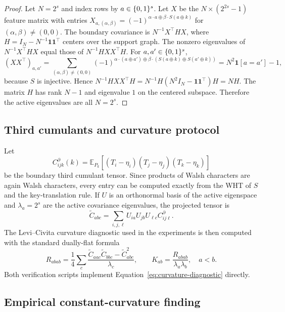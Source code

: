 \begin{proof}
Let $N=2^s$ and index rows by $a\in\{0,1\}^{s}$.  Let $X$ be the $N\times(2^{2s}-1)$
feature matrix with entries
$X_{a,(\alpha,\beta)}=(-1)^{\alpha\cdot a\oplus\beta\cdot S(a\oplus k)}$ for
$(\alpha,
\beta)\neq(0,0)$.  The boundary covariance is
$N^{-1}X^\top H X$, where $H=I_N-N^{-1}\mathbf 1\mathbf 1^\top$ centers over the
support graph.  The nonzero eigenvalues of $N^{-1}X^\top H X$ equal those of
$N^{-1}HXX^\top H$.  For $a,a'\in\{0,1\}^{s}$,
\[
 (XX^\top)_{a,a'}=
 \sum_{(\alpha,\beta)\neq(0,0)}
 (-1)^{\alpha\cdot(a\oplus a')\oplus
 \beta\cdot(S(a\oplus k)\oplus S(a'\oplus k))}
 =N^2\mathbf 1[a=a']-1,
\]
because $S$ is injective.  Hence
$N^{-1}HXX^\top H=N^{-1}H(N^2I_N-\mathbf 1\mathbf 1^\top)H=NH$.
The matrix $H$ has rank $N-1$ and eigenvalue $1$ on the centered subspace.
Therefore the active eigenvalues are all $N=2^s$.
\end{proof}

\subsection{Third cumulants and curvature protocol}\label{subsec:third-cum}

Let
\begin{equation}\label{eq:third-cumulant}
  C^{\partial}_{ijk}(k)=
  \mathbb E_{P_k}\left[(T_i-\eta_i)(T_j-\eta_j)(T_k-\eta_k)\right]
\end{equation}
be the boundary third cumulant tensor.  Since products of Walsh characters are
again Walsh characters, every entry can be computed exactly from the WHT of
$S$ and the key-translation rule.  If $U$ is an orthonormal basis of the active
eigenspace and $\lambda_a=2^s$ are the active covariance eigenvalues, the
projected tensor is
\begin{equation}\label{eq:projected-cumulant}
  \widetilde C_{abc}=\sum_{i,j,\ell}U_{ia}U_{jb}U_{\ell c}C^{\partial}_{ij\ell}.
\end{equation}
The Levi--Civita curvature diagnostic used in the experiments is then computed
with the standard dually-flat formula
\begin{equation}\label{eq:curvature-diagnostic}
  R_{abab}=\frac14\sum_c
  \frac{\widetilde C_{aac}\widetilde C_{bbc}-\widetilde C_{abc}^2}{\lambda_c},
  \qquad
  K_{ab}=\frac{R_{abab}}{\lambda_a\lambda_b},\quad a<b.
\end{equation}
Both verification scripts implement
Equation~\eqref{eq:curvature-diagnostic} directly.

\subsection{Empirical constant-curvature finding}\label{subsec:empirical-curv}


